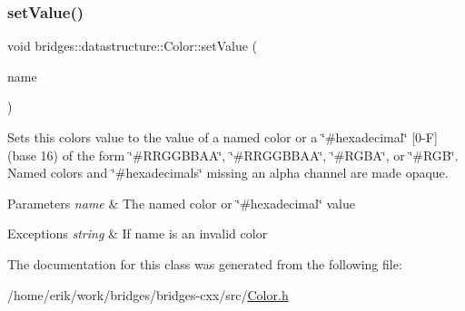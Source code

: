 \subsubsection{\texorpdfstring{set\+Value()}{setValue()}\hspace{0.1cm}{\footnotesize\ttfamily [2/2]}}
{\footnotesize\ttfamily void bridges\+::datastructure\+::\+Color\+::set\+Value (\begin{DoxyParamCaption}\item[{string}]{name }\end{DoxyParamCaption})\hspace{0.3cm}{\ttfamily [inline]}}

Sets this color\textquotesingle{}s value to the value of a named color or a \char`\"{}\#hexadecimal\char`\"{} \mbox{[}0-\/F\mbox{]}(base 16) of the form \char`\"{}\#\+R\+R\+G\+G\+B\+B\+A\+A\char`\"{}, \char`\"{}\#\+R\+R\+G\+G\+B\+B\+A\+A\char`\"{}, \char`\"{}\#\+R\+G\+B\+A\char`\"{}, or \char`\"{}\#\+R\+G\+B\char`\"{}. Named colors and \char`\"{}\#hexadecimals\char`\"{} missing an alpha channel are made opaque.


\begin{DoxyParams}{Parameters}
{\em name} & The named color or \char`\"{}\#hexadecimal\char`\"{} value \\
\hline
\end{DoxyParams}

\begin{DoxyExceptions}{Exceptions}
{\em string} & If name is an invalid color \\
\hline
\end{DoxyExceptions}


The documentation for this class was generated from the following file\+:\begin{DoxyCompactItemize}
\item 
/home/erik/work/bridges/bridges-\/cxx/src/\hyperlink{_color_8h}{Color.\+h}\end{DoxyCompactItemize}
